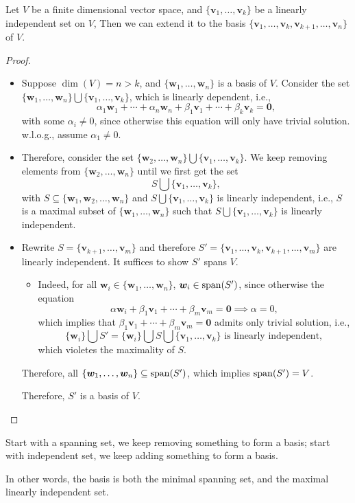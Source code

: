 \begin{theorem}
Let $V$ be a finite dimensional vector space, and $\{\bm v_1,\dots,\bm v_k\}$ be a linearly independent set on $V$, Then we can extend it to the basis 
$\{\bm v_1,\dots,\bm v_k,\bm v_{k+1},\dots,\bm v_n\}$ of $V$.
\end{theorem}
\begin{proof}
\begin{itemize}
\item
Suppose $\dim(V)=n>k$, and $\{\bm w_1,\dots,\bm w_n\}$ is a basis of $V$. 
Consider the set 
$\{
\bm w_1,\dots,\bm w_n
\}
\bigcup
\{
\bm v_1,\dots,\bm v_k
\}$,
which is linearly dependent, i.e., 
\[
\alpha_1\bm w_1+\cdots+\alpha_n\bm w_n
+
\beta_1\bm v_1+\cdots+\beta_k\bm v_k=\bm0,
\]
with some $\alpha_i\ne0$, since otherwise this equation will only have trivial solution. w.l.o.g., assume $\alpha_1\ne0$. 
\item
Therefore, consider the set 
$\{
\bm w_2,\dots,\bm w_n
\}
\bigcup
\{
\bm v_1,\dots,\bm v_k
\}$. 
We keep removing elements from $\{
\bm w_2,\dots,\bm w_n
\}$ until we first get the set 
\[
S\bigcup\{\bm v_1,\dots,\bm v_k\},
\]
with $S\subseteq\{
\bm w_1,\bm w_2,\dots,\bm w_n
\}$
and $S\bigcup\{\bm v_1,\dots,\bm v_k\}$ 
is linearly independent, i.e., 
$S$ is a maximal subset of 
$\{\bm w_1,\dots,\bm w_n\}$ such that 
$S\bigcup\{\bm v_1,\dots,\bm v_k\}$
 is linearly independent.
 \item
Rewrite $S=\{\bm v_{k+1},\dots,\bm v_m\}$ and therefore $S'=\{\bm v_1,\dots,\bm v_k,\bm v_{k+1},\dots,\bm v_m\}$ are linearly independent. It suffices to show $S'$ spans $V$.
\begin{itemize}
\item
Indeed, for all $\bm w_i\in\{\bm w_1,\dots,\bm w_n\}$, $\bm w_i\in\operatorname{span}(S')$, since otherwise the equation 
 \[
 \alpha\bm w_i+\beta_1\bm v_1+\cdots+\beta_m\bm v_m=\bm0\implies\alpha=0,
 \]
 which implies that $\beta_1\bm v_1+\cdots+\beta_m\bm v_m=\bm0$ admits only trivial solution, i.e., 
 \[
 \{\bm w_i\}\bigcup S'=\{\bm w_i\}\bigcup S\bigcup\{\bm v_1,\dots,\bm v_k\}\text{ is linearly independent},
 \]
 which violetes the maximality of $S$.
\end{itemize}
 Therefore, all $\{\bm w_1,\dots,\bm w_n\}\subseteq\operatorname{span}(S')$, which implies $\operatorname{span}(S')=V$.
 
  Therefore, $S'$ is a basis of $V$.
\end{itemize}
\end{proof}
\begin{remark}
Start with a spanning set, we keep removing something to form a basis; 
start with independent set, we keep adding something to form a basis.

In other words, the basis is both the minimal spanning set, and the maximal linearly independent set.
\end{remark}

